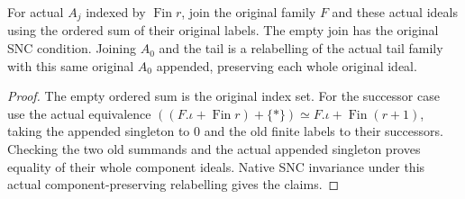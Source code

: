 \begin{lemma}
\label{lem:kn-nadel-bertini-auxiliary-family-labels}
\leanok
For actual $A_j$ indexed by $\operatorname{Fin}r$, join the original
family $F$ and these actual ideals using the ordered sum of their
original labels. The empty join has the original SNC condition. Joining
$A_0$ and the tail is a relabelling of the actual tail family with this
same original $A_0$ appended, preserving each whole original ideal.
\end{lemma}
\begin{proof}
The empty ordered sum is the original index set. For the successor
case use the actual equivalence
$((F.\iota+\operatorname{Fin}r)+\{*\})\simeq
F.\iota+\operatorname{Fin}(r+1)$, taking the appended singleton to $0$
and the old finite labels to their successors. Checking the two old
summands and the actual appended singleton proves equality of their
whole component ideals. Native SNC invariance under this actual
component-preserving relabelling gives the claims.
\end{proof}

